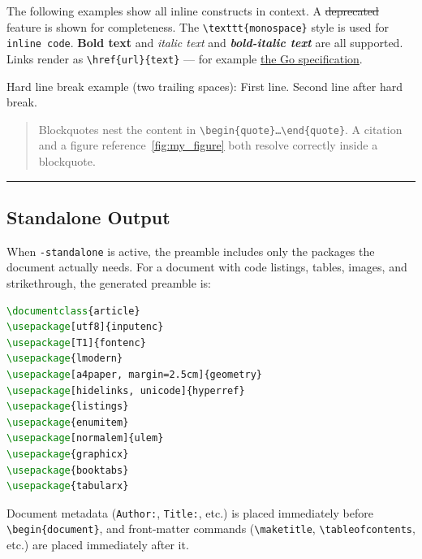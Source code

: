 \documentclass{article}
\begin{document}
The following examples show all inline constructs in context. A \sout{deprecated} feature is shown for completeness. The \texttt{\textbackslash{}texttt\{monospace\}} style is used for \texttt{inline code}. \textbf{Bold text} and \textit{italic text} and \textbf{\textit{bold-italic text}} are all supported. Links render as \texttt{\textbackslash{}href\{url\}\{text\}} — for example \href{https://go.dev/ref/spec}{the Go specification}.

Hard line break example (two trailing spaces): First line. Second line after hard break.

\begin{quote}
Blockquotes nest the content in \texttt{\textbackslash{}begin\{quote\}…\textbackslash{}end\{quote\}}. A citation~\cite{latex2023guide} and a figure reference~\ref{fig:my_figure} both resolve correctly inside a blockquote.

\end{quote}


\noindent\rule{\linewidth}{0.4pt}

\subsection{Standalone Output}

When \texttt{-standalone} is active, the preamble includes only the packages the document actually needs. For a document with code listings, tables, images, and strikethrough, the generated preamble is:

\begin{lstlisting}[language=latex]
\documentclass{article}
\usepackage[utf8]{inputenc}
\usepackage[T1]{fontenc}
\usepackage{lmodern}
\usepackage[a4paper, margin=2.5cm]{geometry}
\usepackage[hidelinks, unicode]{hyperref}
\usepackage{listings}
\usepackage{enumitem}
\usepackage[normalem]{ulem}
\usepackage{graphicx}
\usepackage{booktabs}
\usepackage{tabularx}
\end{lstlisting}

Document metadata (\texttt{Author:}, \texttt{Title:}, etc.) is placed immediately before \texttt{\textbackslash{}begin\{document\}}, and front-matter commands (\texttt{\textbackslash{}maketitle}, \texttt{\textbackslash{}tableofcontents}, etc.) are placed immediately after it.
\end{document}
